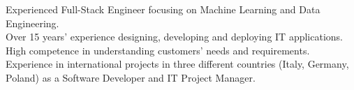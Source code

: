 %
%
%
\par{
Experienced Full-Stack Engineer focusing on Machine Learning and Data Engineering. \\
Over 15 years' experience designing, developing and deploying IT applications. \\
High competence in understanding customers' needs and requirements. \\
Experience in international projects in three different countries (Italy, Germany, Poland) as a Software Developer and IT Project Manager. \\
}